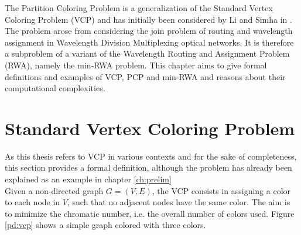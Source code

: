 
The Partition Coloring Problem is a generalization of the Standard Vertex Coloring Problem (VCP) and has initially been considered by Li and Simha in \cite{li-00}. The problem arose from considering the join problem of routing and wavelength assignment in Wavelength Division Multiplexing optical networks. It is therefore a subproblem of a variant of the Wavelength Routing and Assignment Problem (RWA), namely the min-RWA problem. This chapter aims to give formal definitions and examples of VCP, PCP and min-RWA and reasons about their computational complexities.

\section{Standard Vertex Coloring Problem}
As this thesis refers to VCP in various contexts and for the sake of completeness, this section provides a formal definition, although the problem has already been explained as an example in chapter \ref{ch:prelim} \\
Given a non-directed graph $G=(V,E)$, the VCP consists in assigning a color to each node in $V$, such that no adjacent nodes have the same color. The aim is to minimize the chromatic number, i.e. the overall number of colors used. Figure \ref{pd:vcp} shows a simple graph colored with three colors.

